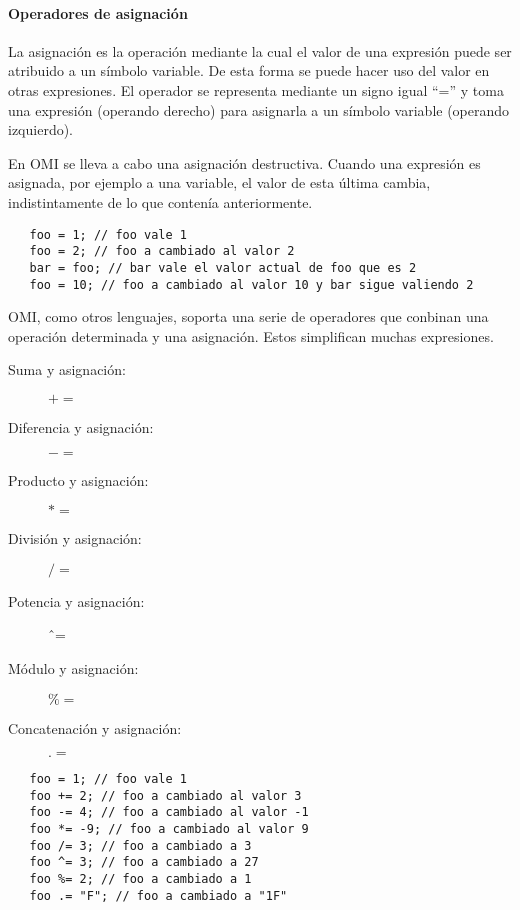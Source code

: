 \paragraph{Operadores de asignación} \label{sec:op_asig}
La asignación es la operación mediante la cual el valor de una expresión puede ser atribuido a un símbolo variable. De esta forma se puede hacer uso 
del valor en otras expresiones. El operador se representa mediante un signo igual ``='' y toma una expresión (operando derecho) para asignarla a un símbolo variable (operando izquierdo).
 

En OMI se lleva a cabo una asignación destructiva. Cuando una expresión es asignada, por ejemplo a una variable, el valor de esta última cambia, indistintamente de lo que contenía
anteriormente.\\

 \begin{lstlisting}
   foo = 1; // foo vale 1
   foo = 2; // foo a cambiado al valor 2
   bar = foo; // bar vale el valor actual de foo que es 2
   foo = 10; // foo a cambiado al valor 10 y bar sigue valiendo 2
\end{lstlisting} 

OMI, como otros lenguajes, soporta una serie de operadores que conbinan una operación determinada y una asignación. Estos simplifican
muchas expresiones.

\begin{description}
\item [Suma y asignación:] $+=$
\item [Diferencia y asignación:] $-=$
\item [Producto y asignación:] $*=$
\item [División y asignación:] $/=$
\item [Potencia y asignación:] \^ \ =\hfill 
\item [Módulo y asignación:] $\%=$
\item [Concatenación y asignación:] $.=$
\end{description} 

 \begin{lstlisting}
   foo = 1; // foo vale 1
   foo += 2; // foo a cambiado al valor 3
   foo -= 4; // foo a cambiado al valor -1
   foo *= -9; // foo a cambiado al valor 9
   foo /= 3; // foo a cambiado a 3
   foo ^= 3; // foo a cambiado a 27
   foo %= 2; // foo a cambiado a 1
   foo .= "F"; // foo a cambiado a "1F" 
\end{lstlisting} 


